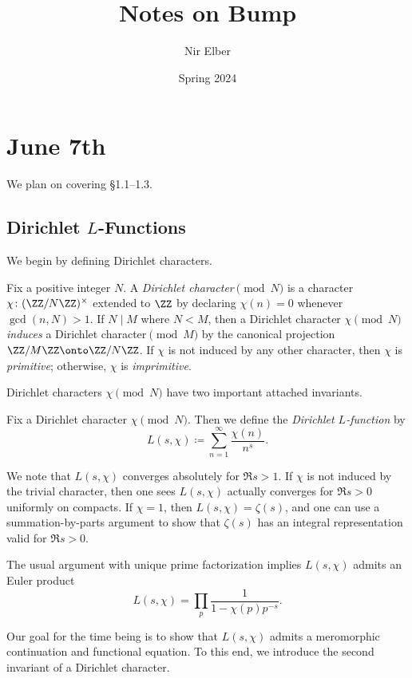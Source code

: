 \documentclass{article}
\title{Notes on Bump}
\author{Nir Elber}
\date{Spring 2024}
\begin{document}
\maketitle

\tableofcontents

\section{June 7th}
We plan on covering \S1.1--1.3.

\subsection{Dirichlet \texorpdfstring{$L$}{ L}-Functions}
We begin by defining Dirichlet characters.
\begin{definition}
	Fix a positive integer $N$. A \textit{Dirichlet character$\pmod N$} is a character $\chi\colon(\ZZ/N\ZZ)^\times$ extended to $\ZZ$ by declaring $\chi(n)=0$ whenever $\gcd(n,N)>1$. If $N\mid M$ where $N<M$, then a Dirichlet character $\chi\pmod N$ \textit{induces} a Dirichlet character$\pmod M$ by the canonical projection $\ZZ/M\ZZ\onto\ZZ/N\ZZ$. If $\chi$ is not induced by any other character, then $\chi$ is \textit{primitive}; otherwise, $\chi$ is \textit{imprimitive}.
\end{definition}
Dirichlet characters $\chi\pmod N$ have two important attached invariants.
\begin{definition}[$L$-function]
	Fix a Dirichlet character $\chi\pmod N$. Then we define the \textit{Dirichlet $L$-function} by
	\[L(s,\chi)\coloneqq\sum_{n=1}^\infty\frac{\chi(n)}{n^s}.\]
\end{definition}
\begin{remark}
	We note that $L(s,\chi)$ converges absolutely for $\Re s>1$. If $\chi$ is not induced by the trivial character, then one sees $L(s,\chi)$ actually converges for $\Re s>0$ uniformly on compacts. If $\chi=1$, then $L(s,\chi)=\zeta(s)$, and one can use a summation-by-parts argument to show that $\zeta(s)$ has an integral representation valid for $\Re s>0$.
\end{remark}
\begin{remark}
	The usual argument with unique prime factorization implies $L(s,\chi)$ admits an Euler product
	\[L(s,\chi)=\prod_p\frac1{1-\chi(p)p^{-s}}.\]
\end{remark}
Our goal for the time being is to show that $L(s,\chi)$ admits a meromorphic continuation and functional equation. To this end, we introduce the second invariant of a Dirichlet character.
\end{document}
